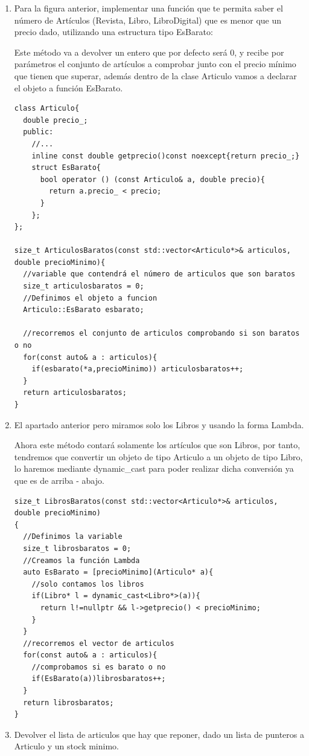 \newpage
{}
\begin{enumerate}
  \item Para la figura anterior, implementar una función que te permita saber el número de Artículos (Revista, Libro, LibroDigital) que es menor que un precio dado, utilizando una estructura tipo EsBarato:

  Este método va a devolver un entero que por defecto será 0, y recibe por parámetros el conjunto de artículos a comprobar junto con el precio mínimo que tienen que superar, además dentro de la clase Articulo vamos a declarar el objeto a función EsBarato.
\begin{verbatim}
class Articulo{
  double precio_;
  public:
    //...
    inline const double getprecio()const noexcept{return precio_;}
    struct EsBarato{
      bool operator () (const Articulo& a, double precio){
        return a.precio_ < precio;
      }
    };
};

size_t ArticulosBaratos(const std::vector<Articulo*>& articulos, double precioMinimo){
  //variable que contendrá el número de articulos que son baratos
  size_t articulosbaratos = 0;
  //Definimos el objeto a funcion
  Articulo::EsBarato esbarato;

  //recorremos el conjunto de articulos comprobando si son baratos o no 
  for(const auto& a : articulos){
    if(esbarato(*a,precioMinimo)) articulosbaratos++;
  }
  return articulosbaratos;
}
\end{verbatim}
  \item El apartado anterior pero miramos solo los Libros y usando la forma Lambda.

  Ahora este método contará solamente los artículos que son Libros, por tanto, tendremos que convertir un objeto de tipo Articulo a un objeto de tipo Libro, lo haremos mediante dynamic\_cast para poder realizar dicha conversión ya que es de arriba - abajo.
\begin{verbatim}
size_t LibrosBaratos(const std::vector<Articulo*>& articulos, double precioMinimo)
{
  //Definimos la variable
  size_t librosbaratos = 0;
  //Creamos la función Lambda
  auto EsBarato = [precioMinimo](Articulo* a){
    //solo contamos los libros
    if(Libro* l = dynamic_cast<Libro*>(a)){
      return l!=nullptr && l->getprecio() < precioMinimo;
    }
  }
  //recorremos el vector de articulos
  for(const auto& a : articulos){
    //comprobamos si es barato o no
    if(EsBarato(a))librosbaratos++;
  }
  return librosbaratos;
}
\end{verbatim}
  \item Devolver el lista de articulos que hay que reponer, dado un lista de punteros a Articulo y un stock minimo.


\end{enumerate}
